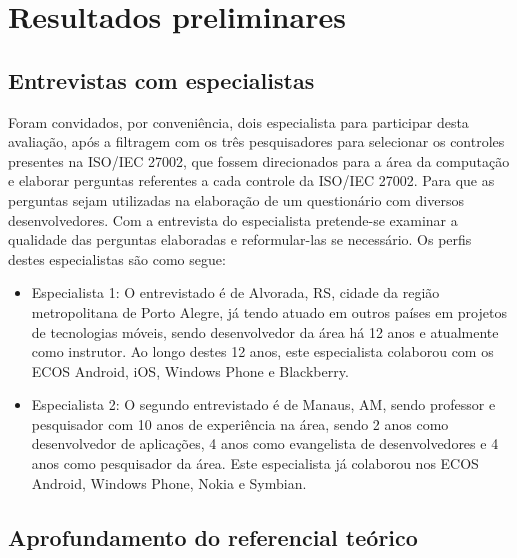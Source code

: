  \chapter{\label{chap:intro}Resultados preliminares}
 




\section{Entrevistas com especialistas}
 
 Foram convidados, por conveniência,  dois especialista para participar desta avaliação, após a filtragem com os três pesquisadores para selecionar os controles presentes na ISO/IEC 27002, que fossem direcionados para a área da computação e elaborar perguntas referentes a cada controle da ISO/IEC 27002. Para que as perguntas sejam utilizadas na elaboração de um questionário com diversos desenvolvedores. Com a entrevista do especialista pretende-se examinar a qualidade das perguntas elaboradas e reformular-las se necessário. Os perfis destes especialistas são como segue:
 
\begin{itemize}

\item  Especialista 1: O entrevistado é de Alvorada, RS, cidade da região metropolitana de Porto Alegre, já tendo atuado em outros países em projetos de tecnologias móveis, sendo desenvolvedor da área há 12 anos e atualmente como instrutor. Ao longo destes 12 anos, este especialista colaborou com os ECOS Android, iOS, Windows Phone e Blackberry.

\item Especialista 2: O segundo entrevistado é de Manaus, AM, sendo professor e pesquisador com 10 anos de experiência na área, sendo 2 anos como desenvolvedor de aplicações, 4 anos como evangelista de desenvolvedores e 4 anos como pesquisador da área. Este especialista já colaborou nos ECOS Android, Windows Phone, Nokia e Symbian.

\end{itemize}


 
 \section{Aprofundamento do referencial teórico}
 
